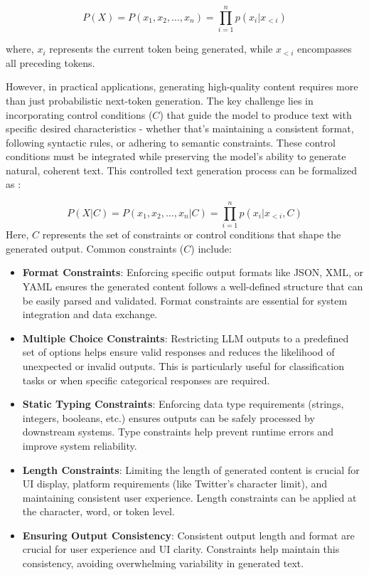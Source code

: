 \begin{equation}
P(X) = P(x_1, x_2, \ldots, x_n) = \prod_{i=1}^n p(x_i|x_{<i})
\end{equation}

where, $x_i$ represents the current token being generated, while $x_{<i}$ encompasses all preceding tokens.

However, in practical applications, generating high-quality content requires more than just probabilistic next-token generation. The key challenge lies in incorporating control conditions ($C$) that guide the model to produce text with specific desired characteristics - whether that's maintaining a consistent format, following syntactic rules, or adhering to semantic constraints. These control conditions must be integrated while preserving the model's ability to generate natural, coherent text. This controlled text generation process can be formalized as :

\begin{equation}
P(X|C) = P(x_1, x_2, \ldots, x_n|C) = \prod_{i=1}^n p(x_i|x_{<i}, C)
\end{equation}
Here, $C$ represents the set of constraints or control conditions that shape the generated output. Common constraints ($C$) include:

\begin{itemize}
    \item \textbf{Format Constraints}: Enforcing specific output formats like JSON, XML, or YAML ensures the generated content follows a well-defined structure that can be easily parsed and validated. Format constraints are essential for system integration and data exchange.
    
    \item \textbf{Multiple Choice Constraints}: Restricting LLM outputs to a predefined set of options helps ensure valid responses and reduces the likelihood of unexpected or invalid outputs. This is particularly useful for classification tasks or when specific categorical responses are required.
    
    \item \textbf{Static Typing Constraints}: Enforcing data type requirements (strings, integers, booleans, etc.) ensures outputs can be safely processed by downstream systems. Type constraints help prevent runtime errors and improve system reliability.
    
    \item \textbf{Length Constraints}: Limiting the length of generated content is crucial for UI display, platform requirements (like Twitter's character limit), and maintaining consistent user experience. Length constraints can be applied at the character, word, or token level.
    
    \item \textbf{Ensuring Output Consistency}: Consistent output length and format are crucial for user experience and UI clarity. Constraints help maintain this consistency, avoiding overwhelming variability in generated text.
\end{itemize}

